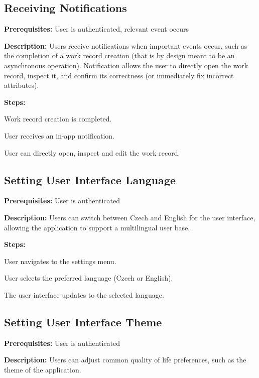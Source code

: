 \documentclass[
  digital,     %
  oneside,     %
  nosansbold,  %
  nocolorbold, %
  lof,         %
  lot,         %
]{fithesis4}
\begin{document}
\subsection{Receiving Notifications}

\noindent \textbf{Prerequisites:} User is authenticated, relevant event occurs

\noindent \textbf{Description:}  
Users receive notifications when important events occur, such as the completion of a work record creation (that is by design meant to be an asynchronous operation). Notification allows the user to directly open the work record, inspect it, and confirm its correctness (or immediately fix incorrect attributes).

\noindent \textbf{Steps:}
\begin{compactenum}
    \item Work record creation is completed.
    \item User receives an in-app notification.
    \item User can directly open, inspect and edit the work record.
\end{compactenum}

\subsection{Setting User Interface Language}

\noindent \textbf{Prerequisites:} User is authenticated

\noindent \textbf{Description:}  
Users can switch between Czech and English for the user interface, allowing the application to support a multilingual user base.

\noindent \textbf{Steps:}
\begin{compactenum}
    \item User navigates to the settings menu.
    \item User selects the preferred language (Czech or English).
    \item The user interface updates to the selected language.
\end{compactenum}

\subsection{Setting User Interface Theme}

\noindent \textbf{Prerequisites:} User is authenticated

\noindent \textbf{Description:}  
Users can adjust common quality of life preferences, such as the theme of the application.
\end{document}
